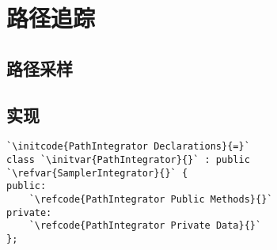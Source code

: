 \section{路径追踪}\label{sec:路径追踪}
\subsection{路径采样}\label{sub:路径采样}
\subsection{实现}\label{sub:实现1454}
\begin{lstlisting}
`\initcode{PathIntegrator Declarations}{=}`
class `\initvar{PathIntegrator}{}` : public `\refvar{SamplerIntegrator}{}` {
public:
    `\refcode{PathIntegrator Public Methods}{}`
private:
    `\refcode{PathIntegrator Private Data}{}`
};
\end{lstlisting}